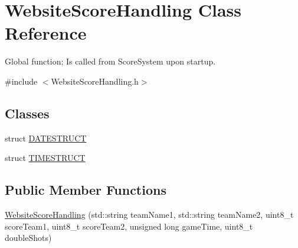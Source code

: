 \hypertarget{class_website_score_handling}{}\section{Website\+Score\+Handling Class Reference}
\label{class_website_score_handling}


Global function; Is called from Score\+System upon startup.  




{\ttfamily \#include $<$Website\+Score\+Handling.\+h$>$}

\subsection*{Classes}
\begin{DoxyCompactItemize}
\item 
struct \hyperlink{struct_website_score_handling_1_1_d_a_t_e_s_t_r_u_c_t}{D\+A\+T\+E\+S\+T\+R\+U\+CT}
\item 
struct \hyperlink{struct_website_score_handling_1_1_t_i_m_e_s_t_r_u_c_t}{T\+I\+M\+E\+S\+T\+R\+U\+CT}
\end{DoxyCompactItemize}
\subsection*{Public Member Functions}
\begin{DoxyCompactItemize}
\item 
\hyperlink{class_website_score_handling_ac0753b597e9933d012400e68b2fc772b}{Website\+Score\+Handling} (std\+::string team\+Name1, std\+::string team\+Name2, uint8\+\_\+t score\+Team1, uint8\+\_\+t score\+Team2, unsigned long game\+Time, uint8\+\_\+t double\+Shots)
\end{DoxyCompactItemize}
